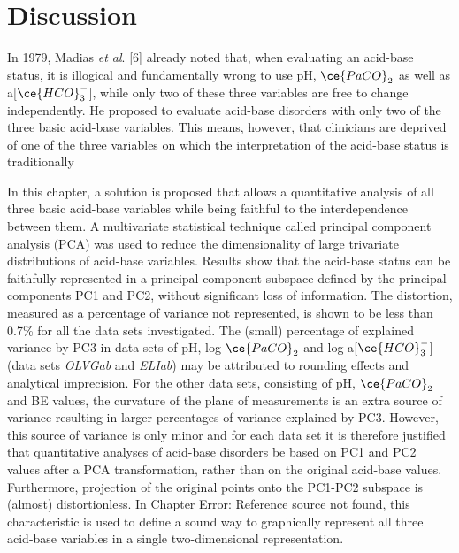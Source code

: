 \documentclass[
  12pt,
  a4paperpaper,
]{report}
\begin{document}
\hypertarget{discussion}{%
\section{Discussion}\label{discussion}}

In 1979, Madias \emph{et al}. {[}6{]} already noted that, when
evaluating an acid-base status, it is illogical and fundamentally wrong
to use pH, \(\ce{PaCO}_{2}\) as well as a{[}\(\ce{HCO}_{3}^{-}\){]},
while only two of these three variables are free to change
independently. He proposed to evaluate acid-base disorders with only two
of the three basic acid-base variables. This means, however, that
clinicians are deprived of one of the three variables on which the
interpretation of the acid-base status is traditionally

In this chapter, a solution is proposed that allows a quantitative
analysis of all three basic acid-base variables while being faithful to
the interdependence between them. A multivariate statistical technique
called principal component analysis (PCA) was used to reduce the
dimensionality of large trivariate distributions of acid-base variables.
Results show that the acid-base status can be faithfully represented in
a principal component subspace defined by the principal components PC1
and PC2, without significant loss of information. The distortion,
measured as a percentage of variance not represented, is shown to be
less than 0.7\% for all the data sets investigated. The (small)
percentage of explained variance by PC3 in data sets of pH, log
\(\ce{PaCO}_{2}\) and log a{[}\(\ce{HCO}_{3}^{-}\){]} (data sets
\emph{OLVGab} and \emph{ELIab}) may be attributed to rounding effects
and analytical imprecision. For the other data sets, consisting of pH,
\(\ce{PaCO}_{2}\) and BE values, the curvature of the plane of
measurements is an extra source of variance resulting in larger
percentages of variance explained by PC3. However, this source of
variance is only minor and for each data set it is therefore justified
that quantitative analyses of acid-base disorders be based on PC1 and
PC2 values after a PCA transformation, rather than on the original
acid-base values. Furthermore, projection of the original points onto
the PC1-PC2 subspace is (almost) distortionless. In Chapter Error:
Reference source not found, this characteristic is used to define a
sound way to graphically represent all three acid-base variables in a
single two-dimensional representation.
\end{document}
